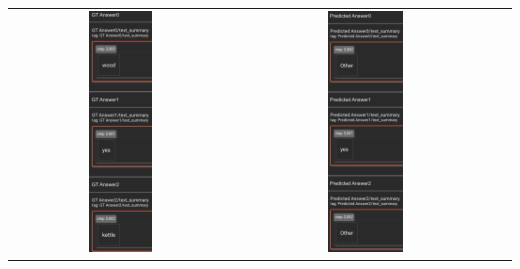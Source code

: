 \documentclass{article}
\begin{document}
\begin{tabular}{ccc}
    \includegraphics[width=0.3\textwidth]{q2.6_8.png} &
    \includegraphics[width=0.3\textwidth]{q2.6_9.png} &

\end{tabular}
\end{document}

